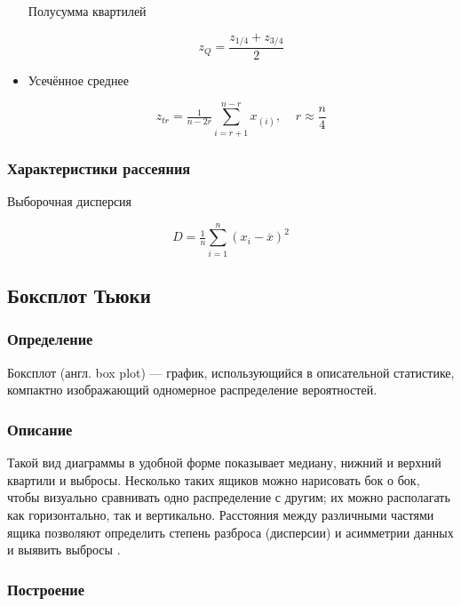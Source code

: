 \begin{itemize}
  Полусумма квартилей
  
  \begin{equation} \label{eq:zQ}
    z_Q = \dfrac{z_{1/4} + z_{3/4}}{2}
  \end{equation}
  
  \item Усечённое среднее
  
  \begin{equation} \label{eq:zTr}
    z_{tr} = \tfrac{1}{n-2r}\sum\limits_{i=r+1}^{n-r} x_{(i)}, \;\;\;\; r \approx \dfrac{n}{4}
  \end{equation}
  
\end{itemize}

\subsubsection{Характеристики рассеяния}

Выборочная дисперсия

\begin{equation}
    D = \tfrac{1}{n}\sum\limits_{i=1}^{n} (x_i - \overline{x})^2
\end{equation}

\subsection{Боксплот Тьюки}

\subsubsection{Определение}

Боксплот (англ. box plot) --- график, использующийся в описательной статистике, компактно изображающий одномерное распределение вероятностей.

\subsubsection{Описание}

Такой вид диаграммы в удобной форме показывает медиану, нижний и верхний квартили и выбросы. Несколько таких ящиков можно нарисовать бок о бок, чтобы визуально сравнивать одно распределение с другим; их можно располагать как горизонтально, так и вертикально. Расстояния между различными частями ящика позволяют определить степень разброса (дисперсии) и асимметрии данных и выявить выбросы \cite{s:boxplot}. 

\subsubsection{Построение}

